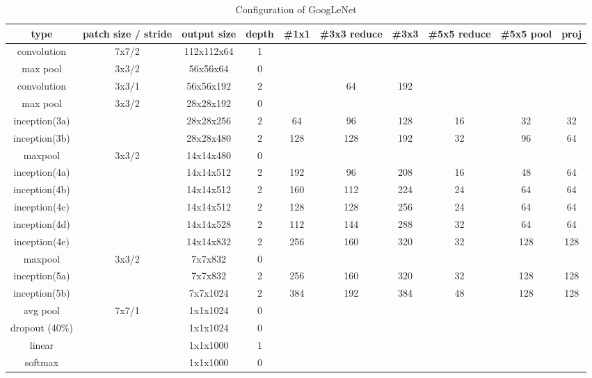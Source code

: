 \begin{table}
  \centering
  \caption{Configuration of GoogLeNet}
    \begin{tabular}{|c|c|c|c|c|c|c|c|c|c|}
    \hline
    type  & patch size / stride & output size & depth & \#1x1 & \#3x3 reduce & \#3x3 & \#5x5 reduce & \#5x5 pool & proj \\\hline
    convolution & 7x7/2 & 112x112x64 & 1     &       &       &       &       &       &  \\\hline
    max pool & 3x3/2 & 56x56x64 & 0     &       &       &       &       &       &  \\\hline
    convolution & 3x3/1 & 56x56x192 & 2     &       & 64    & 192   &       &       &  \\\hline
    max pool & 3x3/2 & 28x28x192 & 0     &       &       &       &       &       &  \\\hline
    inception(3a) &       & 28x28x256 & 2     & 64    & 96    & 128   & 16    & 32    & 32 \\\hline
    inception(3b) &       & 28x28x480 & 2     & 128   & 128   & 192   & 32    & 96    & 64 \\\hline
    maxpool & 3x3/2 & 14x14x480 & 0     &       &       &       &       &       &  \\\hline
    inception(4a) &       & 14x14x512 & 2     & 192   & 96    & 208   & 16    & 48    & 64 \\\hline
    inception(4b) &       & 14x14x512 & 2     & 160   & 112   & 224   & 24    & 64    & 64 \\\hline
    inception(4c) &       & 14x14x512 & 2     & 128   & 128   & 256   & 24    & 64    & 64 \\\hline
    inception(4d) &       & 14x14x528 & 2     & 112   & 144   & 288   & 32    & 64    & 64 \\\hline
    inception(4e) &       & 14x14x832 & 2     & 256   & 160   & 320   & 32    & 128   & 128 \\\hline
    maxpool & 3x3/2 & 7x7x832 & 0     &       &       &       &       &       &  \\\hline
    inception(5a) &       & 7x7x832 & 2     & 256   & 160   & 320   & 32    & 128   & 128 \\\hline
    inception(5b) &       & 7x7x1024 & 2     & 384   & 192   & 384   & 48    & 128   & 128 \\\hline
    avg pool & 7x7/1 & 1x1x1024 & 0     &       &       &       &       &       &  \\\hline
    dropout (40\%) &       & 1x1x1024 & 0     &       &       &       &       &       &  \\\hline
    linear &       & 1x1x1000 & 1     &       &       &       &       &       &  \\\hline
    softmax &       & 1x1x1000 & 0     &       &       &       &       &       &  \\\hline
    \end{tabular}%
  \label{tab:cnn:googlenet}%
\end{table}%
